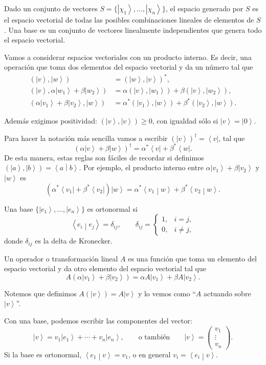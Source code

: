 \documentclass[11pt,a4paper]{article}
\newcommand{\concept}[1]{\textcolor{concept-green}{#1}}
\newcommand{\ket}[1]{\left|#1\right\rangle}
\newcommand{\bra}[1]{\left\langle#1\right|}
\newcommand{\braket}[2]{\left\langle #1\middle|#2\right\rangle}
\begin{document}
Dado un conjunto de vectores $S=\{\ket{\chi_1},\ldots,\ket{\chi_n}\}$, el espacio generado por $S$ es el espacio vectorial de todas las posibles combinaciones lineales de elementos de $S$. Una \concept{base} es un conjunto de vectores linealmente independientes que genera todo el espacio vectorial.

Vamos a considerar espacios vectoriales con un \concept{producto interno}. Es decir, una operación que toma dos elementos del espacio vectorial y da un número tal que
\begin{align*}
  (\ket v,\ket w)&=(\ket w,\ket v)^*,\\
  (\ket v,\alpha\ket{w_1}+\beta\ket{w_2})
    &=\alpha(\ket v,\ket{w_1})+\beta(\ket v,\ket{w_2}),\\
  (\alpha\ket{v_1}+\beta\ket{v_2},\ket w)
    &=\alpha^*(\ket{v_1},\ket w)+\beta^*(\ket{v_2},\ket w).
\end{align*}

Además exigimos positividad: $(\ket v,\ket v)\geq0$, con igualdad sólo si
$\ket v=\ket0$.

Para hacer la notación más sencilla vamos a escribir $(\ket v)^\dagger=\bra v$, tal que
\[
  (\alpha\ket v+\beta\ket w)^\dagger=\alpha^*\bra v+\beta^*\bra w.
\]
De esta manera, estas reglas son fáciles de recordar si definimos $(\ket a,\ket b)=\braket a b$. Por ejemplo, el producto interno entre $\alpha\ket{v_1}+\beta\ket{v_2}$ y $\ket w$ es
\[
  (\alpha^*\bra{v_1}+\beta^*\bra{v_2})\ket w
  =\alpha^*\braket{v_1}{w}+\beta^*\braket{v_2}{w}.
\]

Una base $\{\ket{e_1},\ldots,\ket{e_n}\}$ es ortonormal si
\[
  \braket{e_i}{e_j}=\delta_{ij},
  \qquad
  \delta_{ij}=\begin{cases}
    1,&i=j,\\
    0,&i\neq j,
  \end{cases}
\]
donde $\delta_{ij}$ es la delta de Kronecker.

Un \concept{operador} o \concept{transformación lineal} $A$ es una función que toma un elemento del espacio vectorial y da otro elemento del espacio vectorial tal que
\[
  A(\alpha\ket{v_1}+\beta\ket{v_2})
  =\alpha A\ket{v_1}+\beta A\ket{v_2}.
\]

Notemos que definimos $A(\ket v)=A\ket v$ y lo vemos como ``$A$ actuando sobre $\ket v$''.

Con una base, podemos escribir las \concept{componentes} del vector:
\[
  \ket v=v_1\ket{e_1}+\cdots+v_n\ket{e_n},
  \qquad\text{o también}\qquad
  \ket v=\begin{pmatrix}v_1\\ \vdots\\ v_n\end{pmatrix}.
\]
Si la base es ortonormal, $\braket{e_1}{v}=v_1$, o en general $v_i=\braket{e_i}{v}$.
\end{document}
